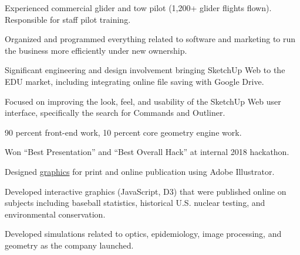 \documentclass[]{mershon-two-column-resume}
\begin{document}
\begin{minipage}[t]{0.66\textwidth}
		\begin{tightemize}
			\item Experienced commercial glider and tow pilot (1,200+ glider flights flown). Responsible for staff pilot training.
			\item Organized and programmed everything related to software and marketing to run the business more efficiently under new ownership.
		\end{tightemize}
		\sectionsep
		
		\begin{tightemize}
			\item Significant engineering and design involvement bringing SketchUp Web to the EDU market, including integrating online file saving with Google Drive.
			\item Focused on improving the look, feel, and usability of the SketchUp Web user interface, specifically the search for Commands and Outliner.
			\item 90 percent front-end work, 10 percent core geometry engine work. 
			\item Won ``Best Presentation'' and ``Best Overall Hack'' at internal 2018 hackathon.
		\end{tightemize}
		\sectionsep
		
		\begin{tightemize}
			\item Designed \href{https://github.com/bmershon/published-urls}{graphics} for print and online publication using Adobe Illustrator. \item Developed interactive graphics (JavaScript, D3) that were published online on subjects including baseball statistics, historical U.S. nuclear testing, and environmental conservation.
		\end{tightemize}
		\sectionsep
		
		\sectionsep
		
		\begin{tightemize}
			\item Developed simulations related to optics, epidemiology, image processing, and geometry as the company launched.
		\end{tightemize}
		\sectionsep
		
	\end{minipage} 
\end{document}
